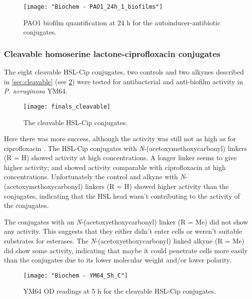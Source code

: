 \begin{figure}[H]
	\begin{center}
		\texttt{[image: "Biochem - PAO1\_24h\_1\_biofilms"]}
		\caption{PAO1 biofilm quantification at 24 h for the autoinducer-antibiotic conjugates.\label{fgr:PAO1_biofilms}}
	\end{center}
\end{figure}

\subsubsection{Cleavable homoserine lactone-ciprofloxacin conjugates\label{sec:bioC}}

The eight cleavable HSL-Cip conjugates, two controls and two alkynes described in \ref{sec:cleavable} (see \ref{fgr:finals_cleavable}) were tested for antibacterial and anti-biofilm activity in \textit{P. aeruginosa} YM64. 

\begin{figure}[H]
	\begin{center}
		\texttt{[image: finals\_cleavable]}
		\caption{The cleavable HSL-Cip conjugates.
 		\label{fgr:finals_cleavable}}
	\end{center}
\end{figure}

Here there was more success, although the activity was still not as high as for ciprofloxacin .
The HSL-Cip conjugates with \textit{N}-(acetoxymethoxycarbonyl) linkers (R = H) showed activity at high concentrations. A longer linker seems to give higher activity;  and  showed activity comparable with ciprofloxacin  at high concentrations.
Unfortunately the control  and alkyne  with \textit{N}-(acetoxymethoxycarbonyl) linkers (R = H) showed higher activity than the conjugates, indicating that the HSL head wasn't contributing to the activity of the conjugates.

The conjugates with an \textit{N}-(acetoxyethoxycarbonyl) linker (R = Me) did not show any activity. This suggests that they either didn't enter cells or weren't suitable substrates for esterases.
The \textit{N}-(acetoxyethoxycarbonyl) linked alkyne (R = Me) did show some activity, indicating that maybe it could penetrate cells more easily than the conjugates due to its lower molecular weight and/or lower polarity.

\begin{figure}[H]
	\begin{center}
		\texttt{[image: "Biochem - YM64\_5h\_C"]}
		\caption{YM64 OD readings at 5 h for the cleavable HSL-Cip conjugates.\label{fgr:YM64_5h_cleavable}}
	\end{center}
\end{figure}
